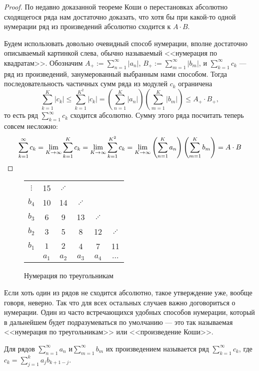 \documentclass[a4paper, 12pt]{article}
\begin{document}
	\begin{proof} По недавно доказанной теореме Коши о перестановках абсолютно сходящегося ряда нам достаточно доказать, что хотя бы при какой-то одной нумерации ряд из произведений абсолютно сходится к $A\cdot B$.	
		
		Будем использовать довольно очевидный способ нумерации, вполне достаточно описываемый картинкой слева, обычно называемый <<нумерация по квадратам>>. 	Обозначим $A_+ := \sum\limits_{n=1}^{\infty}|a_n|$,  $B_+ := \sum\limits_{m=1}^{\infty}|b_m|$, и $\sum\limits_{k=1}^{\infty}c_k$ --- ряд из произведений, занумерованный выбранным нами способом. Тогда последовательность частичных сумм ряда из модулей $c_k$ ограничена \\
		\[
		\sum\limits_{k=1}^{K}|c_k| \leq \sum\limits_{k=1}^{K^2}|c_k| = \left(\sum\limits_{n=1}^{K}|a_n|\right)\left(\sum\limits_{m=1}^{K}|b_m|\right) \leq A_+\cdot B_+,
		\] 
		то есть ряд $\sum\limits_{k=1}^{\infty}c_k$ сходится абсолютно. 
		Сумму этого ряда посчитать теперь совсем несложно:
		\[\sum\limits_{k=1}^{\infty}c_k = \lim\limits_{K\rightarrow \infty} \sum\limits_{k=1}^{K}c_k = \lim\limits_{K\rightarrow \infty} \sum\limits_{k=1}^{K^2}c_k = \lim\limits_{K\rightarrow \infty} \left(\sum\limits_{n=1}^{K}a_n\right)\left(\sum\limits_{m=1}^{K}b_m\right)=A\cdot B
		\]
		\end{proof}
		
	\begin{wrapfigure}{r}{0.3\linewidth}
		\begin{tabular}[t]{c|ccccc}
			$\vdots$ &15& $\iddots$& & & \\
			$b_4$ & 10 & 14&$\iddots$ &&  \\
			$b_3$ & 6 & 9 & 13&$\iddots$ &   \\
			$b_2$ & 3 & 5& 8 & 12&$\iddots$ \\
			$b_1$ & $1$ & $2$ &4&7&11\\
			\hline
			& $a_1$ & $a_2$ & $a_3$ & $a_4$ &$\dots$ \\
		\end{tabular}
		\caption{Нумерация по треугольникам}
		\vspace{-60pt}
	\end{wrapfigure}
	Если хоть один из рядов не сходится абсолютно, такое утверждение уже, вообще говоря, неверно. Так что для всех остальных случаев важно договориться о нумерации. Один из часто встречающихся удобных способов нумерации, который в дальнейшем будет подразумеваться по умолчанию --- это так называемая <<нумерация по треугольникам>> или <<произведение Коши>>.
	\begin{Def}
		Для рядов $\sum\limits_{n=1}^{\infty}a_n$ и$ \sum\limits_{m=1}^{\infty}b_m$ их произведением называется ряд  $\sum\limits_{k=1}^{\infty}c_k$, где $c_k =\sum\limits_{j=1}^{k}a_jb_{k+1-j}$.
	\end{Def}
	
\end{document}
